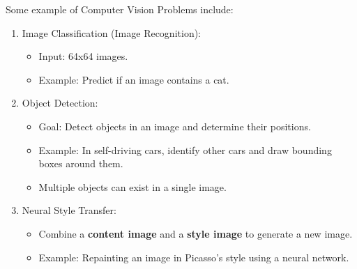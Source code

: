 \documentclass[letterpaper,12pt,notitlepage,twoside]{report}
\begin{document}
Some example of Computer Vision Problems include:
\begin{enumerate}[nosep]
    \item Image Classification (Image Recognition):
    \begin{itemize}
        \item Input: 64x64 images.
        \item Example: Predict if an image contains a cat.
    \end{itemize}

    \item Object Detection:
    \begin{itemize}
        \item Goal: Detect objects in an image and determine their positions.
        \item Example: In self-driving cars, identify other cars and draw bounding boxes around them.
        \item Multiple objects can exist in a single image.
    \end{itemize}

    \item Neural Style Transfer:
    \begin{itemize}
        \item Combine a \textbf{content image} and a \textbf{style image} to generate a new image.
        \item Example: Repainting an image in Picasso's style using a neural network.
    \end{itemize}
\end{enumerate}
\end{document}
